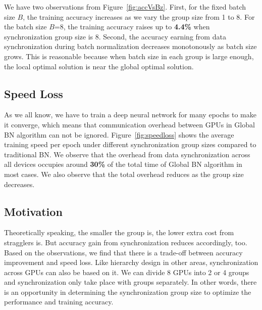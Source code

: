 \documentclass{llncs}
\begin{document}
We have two observations from Figure~\ref{fig:accVsBz}. First, for the fixed batch size $B$, the training accuracy increases as we vary the group size from 1 to 8. For 
the batch size $B$=8, the training accuracy raises up to \textbf{4.4\%} when synchronization group size is 8. 
Second, 
the accuracy earning from data synchronization during batch normalization decreases monotonously as batch size grows. This is reasonable because when batch size in each group is large enough, 
the local optimal solution is near the global optimal solution.



\subsection{Speed Loss}



As we all know, we have to train a deep neural network for many epochs to make it converge, which means that communication overhead between GPUs in Global BN algorithm can not be ignored. Figure~\ref{fig:speedloss} shows 
the average training speed per epoch
under different synchronization group sizes compared to traditional BN.
We observe that the overhead from data synchronization across all devices occupies around \textbf{30\%} of the total time of Global BN algorithm in most cases. 
We also observe that the total overhead reduces as the group size decreases.


\subsection{Motivation}
Theoretically speaking, the smaller the group is, the lower extra cost from stragglers is. But accuracy gain from synchronization reduces accordingly, too.
Based on the observations, we find that there is a trade-off between accuracy improvement and speed loss.
Like hierarchy design in other areas, synchronization across GPUs can also be based on it. We can divide 8 GPUs into 2 or 4 groups and synchronization only take place with groups separately. In other words, there is an opportunity in determining the synchronization group size to optimize the performance and training accuracy.
\end{document}
